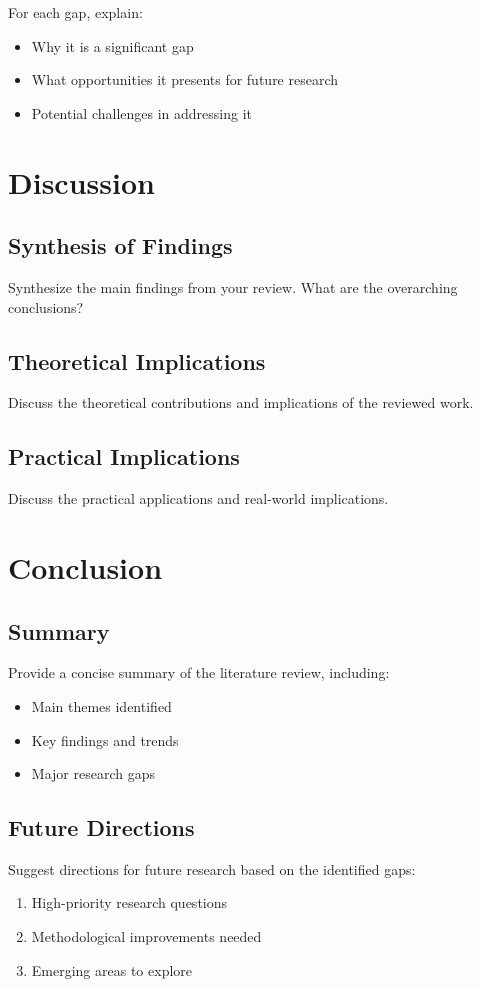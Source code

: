\documentclass[11pt,a4paper]{article}
\begin{document}
For each gap, explain:
\begin{itemize}
    \item Why it is a significant gap
    \item What opportunities it presents for future research
    \item Potential challenges in addressing it
\end{itemize}

\section{Discussion}
\label{sec:discussion}

\subsection{Synthesis of Findings}
Synthesize the main findings from your review. What are the overarching conclusions?

\subsection{Theoretical Implications}
Discuss the theoretical contributions and implications of the reviewed work.

\subsection{Practical Implications}
Discuss the practical applications and real-world implications.

\section{Conclusion}
\label{sec:conclusion}

\subsection{Summary}
Provide a concise summary of the literature review, including:
\begin{itemize}
    \item Main themes identified
    \item Key findings and trends
    \item Major research gaps
\end{itemize}

\subsection{Future Directions}
Suggest directions for future research based on the identified gaps:
\begin{enumerate}
    \item High-priority research questions
    \item Methodological improvements needed
    \item Emerging areas to explore
\end{enumerate}
\end{document}
